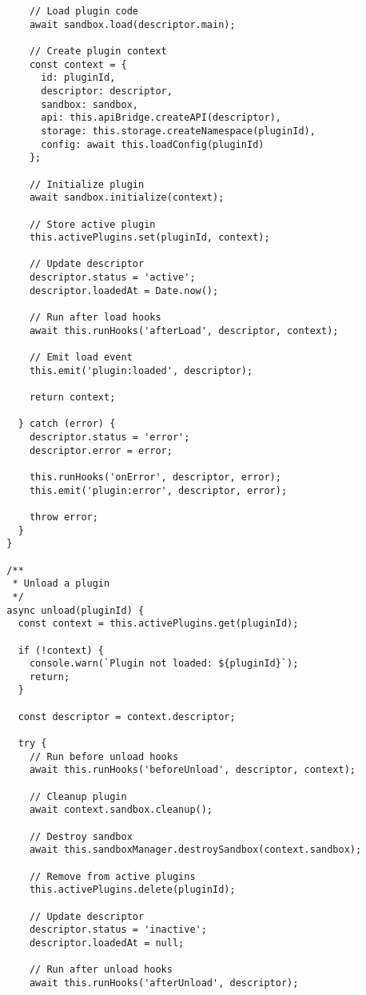 \documentclass[11pt]{article}
\begin{document}
\begin{verbatim}
      // Load plugin code
      await sandbox.load(descriptor.main);
      
      // Create plugin context
      const context = {
        id: pluginId,
        descriptor: descriptor,
        sandbox: sandbox,
        api: this.apiBridge.createAPI(descriptor),
        storage: this.storage.createNamespace(pluginId),
        config: await this.loadConfig(pluginId)
      };
      
      // Initialize plugin
      await sandbox.initialize(context);
      
      // Store active plugin
      this.activePlugins.set(pluginId, context);
      
      // Update descriptor
      descriptor.status = 'active';
      descriptor.loadedAt = Date.now();
      
      // Run after load hooks
      await this.runHooks('afterLoad', descriptor, context);
      
      // Emit load event
      this.emit('plugin:loaded', descriptor);
      
      return context;
      
    } catch (error) {
      descriptor.status = 'error';
      descriptor.error = error;
      
      this.runHooks('onError', descriptor, error);
      this.emit('plugin:error', descriptor, error);
      
      throw error;
    }
  }
  
  /**
   * Unload a plugin
   */
  async unload(pluginId) {
    const context = this.activePlugins.get(pluginId);
    
    if (!context) {
      console.warn(`Plugin not loaded: ${pluginId}`);
      return;
    }
    
    const descriptor = context.descriptor;
    
    try {
      // Run before unload hooks
      await this.runHooks('beforeUnload', descriptor, context);
      
      // Cleanup plugin
      await context.sandbox.cleanup();
      
      // Destroy sandbox
      await this.sandboxManager.destroySandbox(context.sandbox);
      
      // Remove from active plugins
      this.activePlugins.delete(pluginId);
      
      // Update descriptor
      descriptor.status = 'inactive';
      descriptor.loadedAt = null;
      
      // Run after unload hooks
      await this.runHooks('afterUnload', descriptor);
      

\end{verbatim}
\end{document}
